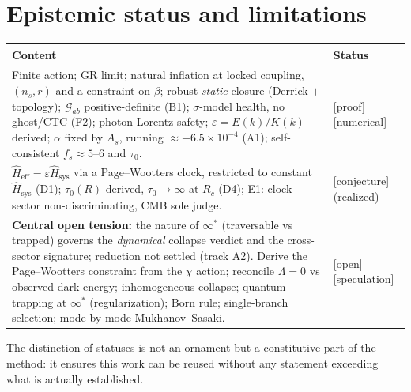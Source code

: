 \documentclass[11pt,a4paper]{article}
\newcommand{\statut}[1]{{\footnotesize\textsf{[#1]}}}
\newcommand{\Heff}{\hat{H}_{\mathrm{eff}}}
\newcommand{\Hsys}{\hat{H}_{\mathrm{sys}}}
\theoremstyle{definition}
\begin{document}
\section{Epistemic status and limitations}
\begin{table}[h]\centering\small
\begin{tabular}{p{}l}
\toprule
Content & Status\\
\midrule
Finite action; GR limit; natural inflation at locked coupling, $(n_s,r)$ and a constraint on
$\beta$; robust \emph{static} closure (Derrick $+$ topology); $\mathcal{G}_{ab}$
positive-definite (B1); $\sigma$-model health, no ghost/CTC (F2); photon Lorentz safety;
$\varepsilon=E(k)/K(k)$ derived; $\alpha$ fixed by $A_s$, running $\approx-6.5\times10^{-4}$
(A1); self-consistent $f_s\approx5$--$6$ and $\tau_0$. & \statut{proof}\statut{numerical}\\
\midrule
$\Heff=\varepsilon\Hsys$ via a Page--Wootters clock, restricted to constant $\Hsys$ (D1);
$\tau_0(R)$ derived, $\tau_0\to\infty$ at $R_c$ (D4); E1: clock sector non-discriminating, CMB
sole judge. & \statut{conjecture} (realized)\\
\midrule
\textbf{Central open tension:} the nature of $\infty^*$ (traversable vs trapped) governs the
\emph{dynamical} collapse verdict and the cross-sector signature; reduction not settled (track
A2). Derive the Page--Wootters constraint from the $\chi$ action; reconcile $\Lambda=0$ vs
observed dark energy; inhomogeneous collapse; quantum trapping at $\infty^*$ (regularization);
Born rule; single-branch selection; mode-by-mode Mukhanov--Sasaki. & \statut{open}\statut{speculation}\\
\bottomrule
\end{tabular}
\end{table}

\noindent The distinction of statuses is not an ornament but a constitutive part of the
method: it ensures this work can be reused without any statement exceeding what is actually
established.

\end{document}
